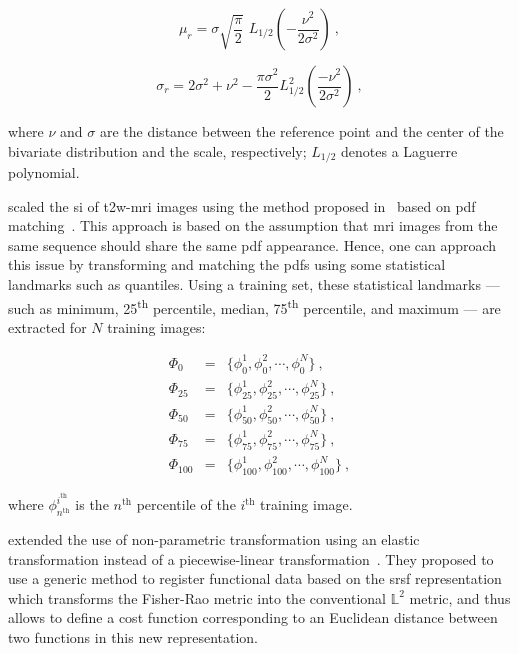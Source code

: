 \begin{enumerate}[leftmargin=*]
\begin{equation}
  \mu_{r} = \sigma  \sqrt{\frac{\pi}{2}}\,\,L_{1/2}(-\frac{\nu^2}{2\sigma^2})  \ ,
  \label{eq:meanr}
\end{equation}

\begin{equation}
  \sigma_{r} = 2\sigma^2+\nu^2-\frac{\pi\sigma^2}{2}L_{1/2}^2\left(\frac{-\nu^2}{2\sigma^2}\right)  \ ,
  \label{eq:var}
\end{equation}

\noindent where $\nu$ and $\sigma$ are the distance between the reference point
and the center of the bivariate distribution and the scale, respectively;
$L_{1/2}$ denotes a Laguerre polynomial.

\citeauthor{Lv2009} scaled the \ac{si} of \ac{t2w}-\ac{mri} images using the
method proposed in~\cite{Nyul2000} based on \ac{pdf} matching~\cite{Lv2009}.
This approach is based on the assumption that \ac{mri} images from the same
sequence should share the same \ac{pdf} appearance.
Hence, one can approach this issue by transforming and matching the \acp{pdf}
using some statistical landmarks such as quantiles.
Using a training set, these statistical landmarks --- such as minimum,
25\textsuperscript{th} percentile, median, 75\textsuperscript{th} percentile,
and maximum --- are extracted for $N$ training images:

\begin{eqnarray}
  \Phi_{0} & = & \{ \phi_{0}^{1}, \phi_{0}^{2}, \cdots, \phi_{0}^{N} \} \ , \nonumber \\
  \Phi_{25} & = & \{ \phi_{25}^{1}, \phi_{25}^{2}, \cdots, \phi_{25}^{N} \} \ , \nonumber \\
  \Phi_{50} & = & \{ \phi_{50}^{1}, \phi_{50}^{2}, \cdots, \phi_{50}^{N} \} \ ,  \label{eq:quantileStd} \\
  \Phi_{75} & = & \{ \phi_{75}^{1}, \phi_{75}^{2}, \cdots, \phi_{75}^{N} \} \ , \nonumber \\
  \Phi_{100} & = & \{ \phi_{100}^{1}, \phi_{100}^{2}, \cdots, \phi_{100}^{N} \} \ , \nonumber
\end{eqnarray}

\noindent where $\phi_{n^\text{th}}^{i^{\text{th}}}$ is the $n^{\text{th}}$
percentile of the $i^{\text{th}}$ training image.

\citeauthor{lemaitre2016normalization} extended the use of non-parametric
transformation using an elastic transformation instead of a piecewise-linear
transformation~\cite{lemaitre2016normalization}.
They proposed to use a generic method to register functional data based on the
\ac{srsf} representation~\cite{Srivastava2011} which transforms the
Fisher-Rao metric into the conventional $\mathbb{L}^2$ metric, and thus allows
to define a cost function corresponding to an Euclidean distance between two
functions in this new representation.


\end{enumerate}
